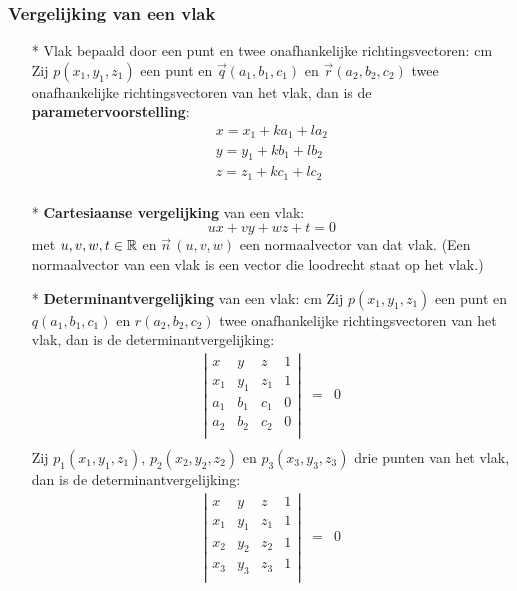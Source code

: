 \subsubsection{Vergelijking van een vlak} \label{vergelijking_vlak}
\hypertarget{vergelijking_vlak}{}
\begin{itemize}
\item[*] Vlak bepaald door een punt en twee onafhankelijke richtingsvectoren: cm
Zij $p(x_1, y_1, z_1)$ een punt en $\vec{q}(a_1, b_1, c_1)$ en $\vec{r}(a_2, b_2, c_2)$ twee onafhankelijke richtingsvectoren van het vlak, dan is de {\bf parametervoorstelling}:
\begin{eqnarray*}
x=x_1+ka_1+la_2\\
y=y_1+kb_1+lb_2\\
z=z_1+kc_1+lc_2\\
\end{eqnarray*}
\item[*] {\bf Cartesiaanse vergelijking} van een vlak:
\[ux+vy+wz+t=0\] met $u, v, w, t \in \mathbb{R}$ en $\vec{n}\,(u, v, w)$ een normaalvector van dat vlak.
(Een normaalvector van een vlak is een vector die loodrecht staat op het vlak.) 
\item[*] {\bf Determinantvergelijking} van een vlak: cm
Zij $p(x_1, y_1, z_1)$ een punt en $q(a_1, b_1, c_1)$ en $r(a_2, b_2, c_2)$ twee onafhankelijke richtingsvectoren van het vlak, dan is de determinantvergelijking:
\begin{eqnarray*}\left|\begin{array}{cccc}
		x & y & z & 1 \\
		x_1 & y_1 & z_1 & 1 \\
		a_1 & b_1 & c_1 & 0 \\
		a_2 & b_2 & c_2 & 0 \\
			\end{array} \right| & = & 0 \\
\end{eqnarray*}
Zij $p_1(x_1, y_1, z_1)$, $p_2(x_2, y_2, z_2)$ en $p_3(x_3, y_3, z_3)$ drie punten van het vlak, dan is de determinantvergelijking:
\begin{eqnarray*}\left|\begin{array}{cccc}
		x & y & z & 1 \\
		x_1 & y_1 & z_1 & 1 \\
		x_2 & y_2 & z_2 & 1 \\
		x_3 & y_3 & z_3 & 1 \\
		\end{array} \right| & = & 0\\
\end{eqnarray*}
\end{itemize}

